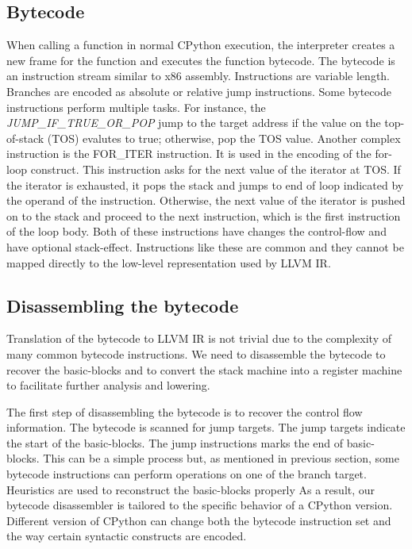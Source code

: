 \documentclass{acm_proc_article-sp}
\begin{document}
\subsection{Bytecode}

When calling a function in normal CPython execution, the interpreter creates
a new frame for the function and executes the function bytecode.
The bytecode is an instruction stream similar to x86 assembly.
Instructions are variable length. Branches are encoded as absolute or relative
jump instructions. Some bytecode instructions perform multiple tasks.
For instance, the \textit{JUMP\_IF\_TRUE\_OR\_POP} jump to the
target address if the value on the top-of-stack (TOS) evalutes to true;
otherwise, pop the TOS value.  Another complex instruction is the FOR\_ITER
instruction.  It is used in the encoding of the for-loop construct.
This instruction asks for the next value of the iterator at TOS.
If the iterator is exhausted, it pops the stack and jumps to end of loop
indicated by the operand of the instruction.  Otherwise, the next value of the
iterator is pushed on to the stack and proceed to the next instruction, which
is the first instruction of the loop body. Both of these instructions have
changes the control-flow and have optional stack-effect. \cite{pythondoc:dis}
Instructions like these are common and they cannot be mapped directly to
the low-level representation used by LLVM IR.

\subsection{Disassembling the bytecode}

Translation of the bytecode to LLVM IR is not trivial due to the
complexity of many common bytecode instructions.  We need to disassemble
the bytecode to recover the basic-blocks and to convert the stack machine into
a register machine to facilitate further analysis and lowering.

The first step of disassembling the bytecode is to recover the control flow
information. The bytecode is scanned for jump targets. The jump targets
indicate the start of the basic-blocks.  The jump instructions marks the
end of basic-blocks. This can be a simple process but, as mentioned in previous
section, some bytecode instructions can perform  operations on one of the
branch target.  Heuristics are used to reconstruct the basic-blocks properly
As a result, our bytecode disassembler is tailored to the specific behavior of
a CPython version.  Different version of CPython can change both the bytecode
instruction set and the way certain syntactic constructs are encoded.
\end{document}
